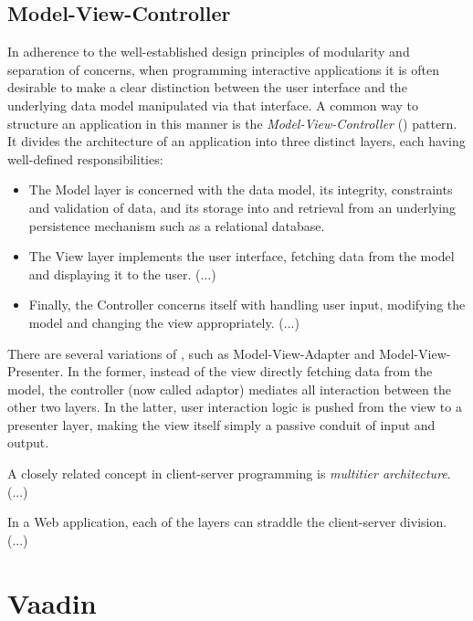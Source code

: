 \subsection{Model-View-Controller}

In adherence to the well-established design principles of modularity and separation of concerns, when programming interactive applications it is often desirable to make a clear distinction between the user interface and the underlying data model manipulated via that interface. A common way to structure an application in this manner is the \emph{Model-View-Controller} () pattern. It divides the architecture of an application into three distinct layers, each having well-defined responsibilities:

\begin{itemize}

    \item The Model layer is concerned with the data model, its integrity, constraints and validation of data, and its storage into and retrieval from an underlying persistence mechanism such as a relational database.
    
    \item The View layer implements the user interface, fetching data from the model and displaying it to the user. (...)
    
    \item Finally, the Controller concerns itself with handling user input, modifying the model and changing the view appropriately. (...)

\end{itemize}





There are several variations of , such as Model-View-Adapter and Model-View-Presenter. In the former, instead of the view directly fetching data from the model, the controller (now called adaptor) mediates all interaction between the other two layers. In the latter, user interaction logic is pushed from the view to a presenter layer, making the view itself simply a passive conduit of input and output.

A closely related concept in client-server programming is \emph{multitier architecture}. (...)

In a Web application, each of the layers can straddle the client-server division. (...)

\section{Vaadin}

